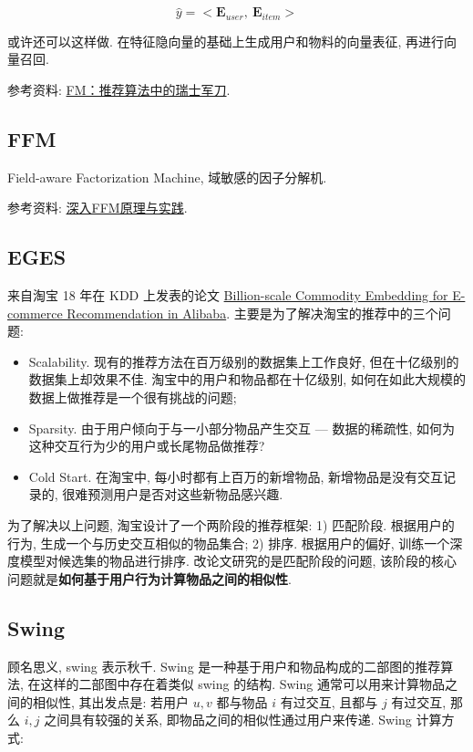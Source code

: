 $$
\hat{y} = <\boldsymbol{E}_{user},\ \boldsymbol{E}_{item}>
$$

或许还可以这样做. 在特征隐向量的基础上生成用户和物料的向量表征, 再进行向量召回. 

参考资料: \href{https://zhuanlan.zhihu.com/p/343174108}{FM：推荐算法中的瑞士军刀}.

\subsection{FFM}
Field-aware Factorization Machine\cite{juan_ffm_2016_recsys}, 域敏感的因子分解机. 

参考资料: \href{https://tech.meituan.com/2016/03/03/deep-understanding-of-ffm-principles-and-practices.html}{深入FFM原理与实践}.

\subsection{EGES}
来自淘宝 18 年在 KDD 上发表的论文 \href{https://arxiv.org/pdf/1803.02349.pdf}{Billion-scale Commodity Embedding for E-commerce	Recommendation in Alibaba}. 主要是为了解决淘宝的推荐中的三个问题: 
\begin{itemize}
	\item Scalability. 现有的推荐方法在百万级别的数据集上工作良好, 但在十亿级别的数据集上却效果不佳. 淘宝中的用户和物品都在十亿级别, 如何在如此大规模的数据上做推荐是一个很有挑战的问题;
	
	\item Sparsity. 由于用户倾向于与一小部分物品产生交互 --- 数据的稀疏性, 如何为这种交互行为少的用户或长尾物品做推荐?
	

	\item Cold Start. 在淘宝中, 每小时都有上百万的新增物品, 新增物品是没有交互记录的, 很难预测用户是否对这些新物品感兴趣.
\end{itemize}

为了解决以上问题, 淘宝设计了一个两阶段的推荐框架: 1) 匹配阶段. 根据用户的行为, 生成一个与历史交互相似的物品集合; 2) 排序. 根据用户的偏好, 训练一个深度模型对候选集的物品进行排序. 改论文研究的是匹配阶段的问题, 该阶段的核心问题就是\textbf{如何基于用户行为计算物品之间的相似性}.

\subsection{Swing}
顾名思义, swing 表示秋千. Swing 是一种基于用户和物品构成的二部图的推荐算法, 在这样的二部图中存在着类似 swing 的结构. Swing 通常可以用来计算物品之间的相似性, 其出发点是: 若用户 $u, v$ 都与物品 $i$ 有过交互, 且都与 $j$ 有过交互, 那么 $i, j$ 之间具有较强的关系, 即物品之间的相似性通过用户来传递. Swing 计算方式:

